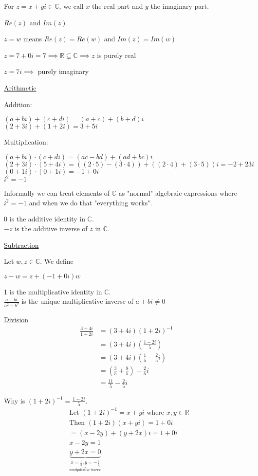 \documentclass{article}
\begin{document}
For $z = x + yi \in \mathbb{C}$, we call $x$ the real part and $y$ the imaginary part. 

$Re(z)$ and $Im(z)$

$z = w$ means $Re(z)=Re(w)$ and $Im(z) = Im(w)$

$z = 7 + 0i = 7 \implies \mathbb{R} \subsetneq \mathbb{C} \implies z$ is purely real 

$z = 7i \implies$ purely imaginary

\underline{Arithmetic}

Addition:

$(a + bi)+(c+di)=(a+c)+(b+d)i$\\
$(2+3i)+(1+2i) = 3 + 5i$

Multiplication:

$(a+bi)\cdot(c+di) = (ac-bd)+(ad+bc)i$\\
$(2+3i)\cdot(5+4i) = ((2\cdot 5)-(3\cdot 4)) + ((2\cdot 4)+(3 \cdot 5))i = -2 + 23i$\\
$(0 + 1i)\cdot(0+1i) = -1 + 0i$\\
$i^2 = -1$

Informally we can treat elements of $\mathbb{C}$ as "normal" algebraic expressions where $i^2 = -1$ and when we do that "everything works". 

0 is the additive identity in $\mathbb{C}$.\\
$-z$ is the additive inverse of $z$ in $\mathbb{C}$.

\underline{Subtraction}

Let $w,z \in \mathbb{C}$. We define

$z - w = z +(-1 + 0i)w$

1 is the multiplicative identity in $\mathbb{C}$.\\
$\frac{a-bi}{a^2+b^2}$ is the unique multiplicative inverse of $a+bi\ne 0$

\underline{Division}
\begin{align*}
    \frac{3+4i}{1+2i} &= (3+4i)(1+2i)^{-1}\\
    &= (3+4i)(\frac{1-2i}{5}) \\
    &= (3+4i)(\frac{1}{5}-\frac{2}{5}i) \\
    &= (\frac{3}{5} + \frac{8}{5}) - \frac{2}{5}i\\
    &= \frac{11}{5} - \frac{2}{5}i
\end{align*}

Why is $(1+2i)^{-1} = \frac{1-2i}{5}.$
\begin{align*}
    &\text{Let } (1+2i)^{-1} = x + yi \text{ where }x,y\in \mathbb{R}\\
    &\text{Then } (1+2i)(x+yi) = 1 + 0i\\
    &= (x-2y)+(y+2x)i = 1 + 0i\\
    &x-2y = 1\\
    &\underbrace{y+2x = 0}_{\underbrace{x = \frac{1}{5}, y=-\frac{2}{5}}_{\text{multiplicative inverse}}}
\end{align*}
\end{document}
